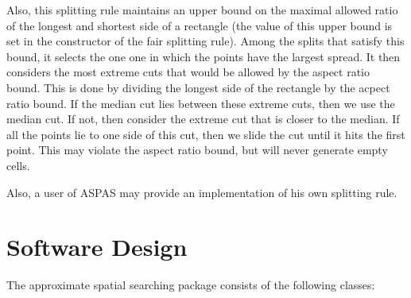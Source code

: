 \begin{itemize}
Also, this splitting rule maintains an upper
bound on the maximal allowed ratio of the longest and shortest side of
a rectangle (the value of this upper bound is set in the constructor of the
fair splitting rule). Among the splits that satisfy this bound, it selects
the one one in which the points have the largest spread.
It then considers the most extreme cuts that would be allowed by the
aspect ratio bound. This is done by dividing the longest side of
the rectangle by the acpect ratio bound. If the median cut lies
between these extreme cuts, then we use the median cut. If not,
then consider the extreme cut that is closer to the median.
If all the points lie to one side of this cut, then we slide the cut
until it hits the first point.
This may violate the aspect ratio bound, but will never generate empty cells.

\end{itemize}

Also, a user of ASPAS may provide an implementation of his own
splitting rule.

\section{Software Design}

The approximate spatial searching package consists of the following classes:

